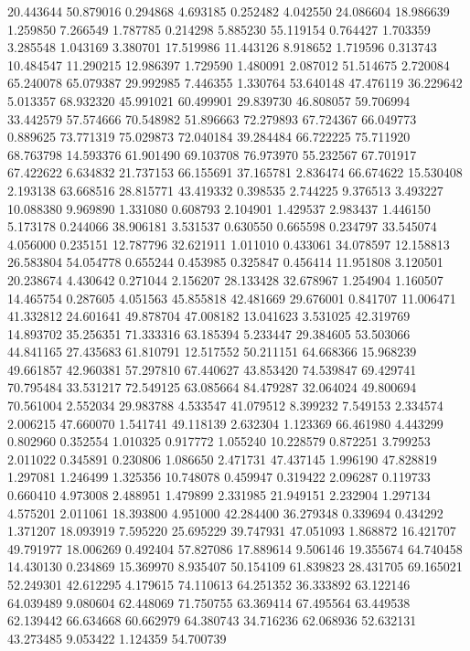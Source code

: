 20.443644
50.879016
0.294868
4.693185
0.252482
4.042550
24.086604
18.986639
1.259850
7.266549
1.787785
0.214298
5.885230
55.119154
0.764427
1.703359
3.285548
1.043169
3.380701
17.519986
11.443126
8.918652
1.719596
0.313743
10.484547
11.290215
12.986397
1.729590
1.480091
2.087012
51.514675
2.720084
65.240078
65.079387
29.992985
7.446355
1.330764
53.640148
47.476119
36.229642
5.013357
68.932320
45.991021
60.499901
29.839730
46.808057
59.706994
33.442579
57.574666
70.548982
51.896663
72.279893
67.724367
66.049773
0.889625
73.771319
75.029873
72.040184
39.284484
66.722225
75.711920
68.763798
14.593376
61.901490
69.103708
76.973970
55.232567
67.701917
67.422622
6.634832
21.737153
66.155691
37.165781
2.836474
66.674622
15.530408
2.193138
63.668516
28.815771
43.419332
0.398535
2.744225
9.376513
3.493227
10.088380
9.969890
1.331080
0.608793
2.104901
1.429537
2.983437
1.446150
5.173178
0.244066
38.906181
3.531537
0.630550
0.665598
0.234797
33.545074
4.056000
0.235151
12.787796
32.621911
1.011010
0.433061
34.078597
12.158813
26.583804
54.054778
0.655244
0.453985
0.325847
0.456414
11.951808
3.120501
20.238674
4.430642
0.271044
2.156207
28.133428
32.678967
1.254904
1.160507
14.465754
0.287605
4.051563
45.855818
42.481669
29.676001
0.841707
11.006471
41.332812
24.601641
49.878704
47.008182
13.041623
3.531025
42.319769
14.893702
35.256351
71.333316
63.185394
5.233447
29.384605
53.503066
44.841165
27.435683
61.810791
12.517552
50.211151
64.668366
15.968239
49.661857
42.960381
57.297810
67.440627
43.853420
74.539847
69.429741
70.795484
33.531217
72.549125
63.085664
84.479287
32.064024
49.800694
70.561004
2.552034
29.983788
4.533547
41.079512
8.399232
7.549153
2.334574
2.006215
47.660070
1.541741
49.118139
2.632304
1.123369
66.461980
4.443299
0.802960
0.352554
1.010325
0.917772
1.055240
10.228579
0.872251
3.799253
2.011022
0.345891
0.230806
1.086650
2.471731
47.437145
1.996190
47.828819
1.297081
1.246499
1.325356
10.748078
0.459947
0.319422
2.096287
0.119733
0.660410
4.973008
2.488951
1.479899
2.331985
21.949151
2.232904
1.297134
4.575201
2.011061
18.393800
4.951000
42.284400
36.279348
0.339694
0.434292
1.371207
18.093919
7.595220
25.695229
39.747931
47.051093
1.868872
16.421707
49.791977
18.006269
0.492404
57.827086
17.889614
9.506146
19.355674
64.740458
14.430130
0.234869
15.369970
8.935407
50.154109
61.839823
28.431705
69.165021
52.249301
42.612295
4.179615
74.110613
64.251352
36.333892
63.122146
64.039489
9.080604
62.448069
71.750755
63.369414
67.495564
63.449538
62.139442
66.634668
60.662979
64.380743
34.716236
62.068936
52.632131
43.273485
9.053422
1.124359
54.700739
